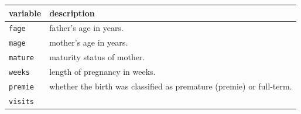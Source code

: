 \documentclass[]{book}
\theoremstyle{definition}
\theoremstyle{definition}
\theoremstyle{definition}
\theoremstyle{remark}
\begin{document}
\begin{longtable}[]{@{}ll@{}}
\toprule
\begin{minipage}[b]{0.22\columnwidth}\raggedright\strut
variable\strut
\end{minipage} & \begin{minipage}[b]{0.16\columnwidth}\raggedright\strut
description\strut
\end{minipage}\tabularnewline
\midrule
\endhead
\begin{minipage}[t]{0.22\columnwidth}\raggedright\strut
\texttt{fage}\strut
\end{minipage} & \begin{minipage}[t]{0.16\columnwidth}\raggedright\strut
father's age in years.\strut
\end{minipage}\tabularnewline
\begin{minipage}[t]{0.22\columnwidth}\raggedright\strut
\texttt{mage}\strut
\end{minipage} & \begin{minipage}[t]{0.16\columnwidth}\raggedright\strut
mother's age in years.\strut
\end{minipage}\tabularnewline
\begin{minipage}[t]{0.22\columnwidth}\raggedright\strut
\texttt{mature}\strut
\end{minipage} & \begin{minipage}[t]{0.16\columnwidth}\raggedright\strut
maturity status of mother.\strut
\end{minipage}\tabularnewline
\begin{minipage}[t]{0.22\columnwidth}\raggedright\strut
\texttt{weeks}\strut
\end{minipage} & \begin{minipage}[t]{0.16\columnwidth}\raggedright\strut
length of pregnancy in weeks.\strut
\end{minipage}\tabularnewline
\begin{minipage}[t]{0.22\columnwidth}\raggedright\strut
\texttt{premie}\strut
\end{minipage} & \begin{minipage}[t]{0.16\columnwidth}\raggedright\strut
whether the birth was classified as premature (premie) or
full-term.\strut
\end{minipage}\tabularnewline
\begin{minipage}[t]{0.22\columnwidth}\raggedright\strut
\texttt{visits}\strut
\end{minipage} & \begin{minipage}[t]{0.16\columnwidth}\raggedright\strut

\end{minipage}
\end{longtable}
\end{document}
